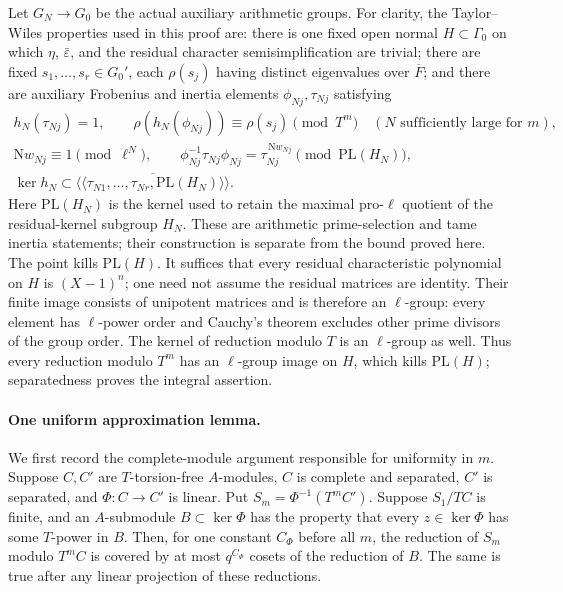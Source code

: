 Let \(G_N\to G_0\) be the actual auxiliary arithmetic groups.
For clarity, the Taylor--Wiles properties used in this proof are:
there is one fixed open normal \(H\subset\Gamma_0\) on which
\(\eta\), \(\bar\varepsilon\), and the residual character semisimplification
are trivial; there are fixed \(s_1,\ldots,s_r\in G_0'\), each
\(\rho(s_j)\) having distinct eigenvalues over \(\overline F\);
and there are auxiliary Frobenius and inertia elements
\(\phi_{Nj},\tau_{Nj}\) satisfying
\[
 \begin{gathered}
 h_N(\tau_{Nj})=1,\qquad
 \rho(h_N(\phi_{Nj}))\equiv\rho(s_j)\pmod{T^m}
       \quad(N\text{ sufficiently large for }m),\\
 \mathrm Nw_{Nj}\equiv1\pmod{\ell^N},\qquad
 \phi_{Nj}^{-1}\tau_{Nj}\phi_{Nj}
           =\tau_{Nj}^{\,\mathrm Nw_{Nj}}
               \pmod{\mathrm{PL}(H_N)},\\
 \ker h_N\subset
 \overline{\langle\!\langle\tau_{N1},\ldots,\tau_{Nr},
                      \mathrm{PL}(H_N)\rangle\!\rangle}.
 \tag{B2b}
 \end{gathered}
\]
Here \(\mathrm{PL}(H_N)\) is the kernel used to retain the maximal
pro-\(\ell\) quotient of the residual-kernel subgroup \(H_N\).
These are arithmetic prime-selection and tame inertia statements;
their construction is separate from the bound proved here.
The point kills \(\mathrm{PL}(H)\).
It suffices that every residual characteristic polynomial on \(H\)
is \((X-1)^n\); one need not assume the residual matrices are identity.
Their finite image consists of unipotent matrices and is therefore
an \(\ell\)-group: every element has \(\ell\)-power order and
Cauchy's theorem excludes other prime divisors of the group order.
The kernel of reduction modulo \(T\) is an \(\ell\)-group as well.
Thus every reduction modulo \(T^m\) has an \(\ell\)-group image on
\(H\), which kills \(\mathrm{PL}(H)\); separatedness proves the
integral assertion.

\paragraph{One uniform approximation lemma.}
We first record the complete-module argument responsible for uniformity
in \(m\).  Suppose \(C,C'\) are \(T\)-torsion-free \(A\)-modules,
\(C\) is complete and separated, \(C'\) is separated, and
\(\Phi:C\to C'\) is linear.  Put
\(S_m=\Phi^{-1}(T^mC')\).
Suppose \(S_1/TC\) is finite, and an \(A\)-submodule \(B\subset\ker\Phi\) has the
property that every \(z\in\ker\Phi\) has some \(T\)-power in \(B\).
Then, for one constant \(C_\Phi\) before all \(m\), the reduction
of \(S_m\) modulo \(T^mC\) is covered by at most \(q^{C_\Phi}\)
cosets of the reduction of \(B\).
The same is true after any linear projection of these reductions.

